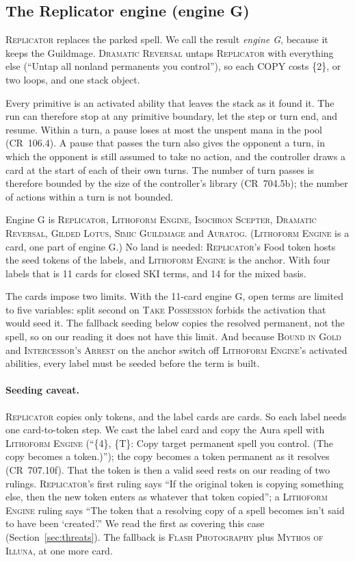 \documentclass[11pt]{article}
\theoremstyle{definition}
\newcommand{\ms}[1]{\{#1\}}
\newcommand{\card}[1]{{\mdseries\scshape #1}}
\newcommand{\CR}[1]{CR~#1}
\begin{document}
\subsection{The Replicator engine (engine G)}

\card{Replicator} replaces the parked spell. We call the result \emph{engine G}, because it
keeps the Guildmage. \card{Dramatic Reversal} untaps \card{Replicator} with everything else
(``Untap all nonland permanents you control''), so each COPY costs \ms{2}, or two loops,
and one stack object.

Every primitive is an activated ability that leaves the stack as it found it. The run can
therefore stop at any primitive boundary, let the step or turn end, and resume. Within a
turn, a pause loses at most the unspent mana in the pool (\CR{106.4}). A pause that
passes the turn also gives the opponent a turn, in which the opponent is still assumed to
take no action, and the controller draws a card at the start of each of their own turns.
The number of turn passes is therefore bounded by the size of the controller's library
(\CR{704.5b}); the number of actions within a turn is not bounded.

Engine G is \card{Replicator}, \card{Lithoform Engine}, \card{Isochron Scepter},
\card{Dramatic Reversal}, \card{Gilded Lotus}, \card{Simic Guildmage} and \card{Auratog}.
(\card{Lithoform Engine} is a card, one part of engine G.) No land is needed:
\card{Replicator}'s Food token hosts the seed tokens of the labels, and \card{Lithoform
Engine} is the anchor. With four labels that is 11 cards for closed SKI terms, and 14 for
the mixed basis.

The cards impose two limits. With the 11-card engine G, open terms are limited to five
variables: split second on \card{Take Possession} forbids the activation that would seed
it. The fallback seeding below copies the resolved permanent, not the spell, so on our
reading it does not have this limit. And because \card{Bound in
Gold} and \card{Intercessor's Arrest} on the anchor switch off \card{Lithoform Engine}'s
activated abilities, every label must be seeded before the term is built.

\paragraph{Seeding caveat.} \card{Replicator} copies only tokens, and the label cards are
cards. So each label needs one card-to-token step. We cast the label card and copy the Aura
spell with \card{Lithoform Engine} (``\ms{4}, \ms{T}: Copy target permanent spell you
control. (The copy becomes a token.)''); the copy becomes a token permanent as it resolves
(\CR{707.10f}). That the token is then a valid seed rests on our reading of two rulings.
\card{Replicator}'s first ruling says ``If the original token is copying something else,
then the new token enters as whatever that token copied''; a \card{Lithoform Engine} ruling
says ``The token that a resolving copy of a spell becomes isn't said to have been
`created'.'' We read the first as covering this case (Section~\ref{sec:threats}). The
fallback is \card{Flash Photography} plus \card{Mythos of Illuna}, at one more card.
\end{document}
